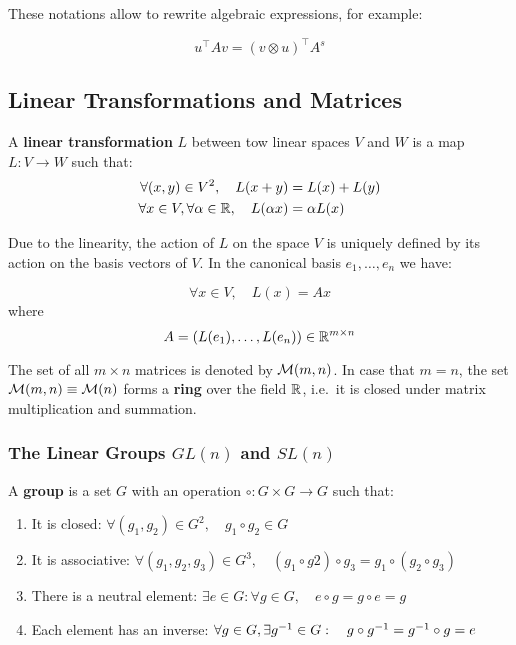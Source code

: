 \noindent
These notations allow to rewrite algebraic expressions, for example:

\[u^{\top} A v = {( v \otimes u )}^{\top} A^s\]

\subsection{Linear Transformations and Matrices}
\label{sub:linear_transformations_and_matrices}

A \textbf{linear transformation} $L$ between tow linear spaces
$V$ and $W$ is a map $L : V \rightarrow W$ such that:
\begin{align*}
	\forall (x,y) \in V^2 ,\quad L(x+y) &= L(x) + L(y) \\
	\forall x \in V, \forall \alpha \in \mathbb{R},\quad L(\alpha x) &= \alpha L(x)
\end{align*}

\noindent
Due to the linearity, the action of $L$ on the space $V$
is uniquely defined by its action on the basis vectors of $V$.
In the canonical basis ${e_1, \ldots, e_n}$ we have:

\[\forall x \in V, \quad L(x) = Ax\]
\noindent
where
\[A = (L(e_1), \ldots, L(e_n)) \in \mathbb{R}^{m \times n}\]

\noindent
The set of all $m \times n$ matrices is denoted by $\mathcal{M}(m,n)$.
In case that $m = n$, the set $\mathcal{M}(m,n) \equiv \mathcal{M}(n)$
forms a \textbf{ring} over the field $\mathbb{R}$, i.e.\ it is closed
under matrix multiplication and summation.


\subsubsection{The Linear Groups $GL(n)$ and $SL(n)$}
\label{ssub:the_linear_groups_gl_n_and_sl_n_}

A \textbf{group} is a set $G$ with an operation
$\circ : G \times G \rightarrow G$ such that:
\begin{enumerate}
	\item It is closed:
		$\forall (g_1, g_2) \in G^2, \quad g_1 \circ g_2 \in G$
	\item It is associative:
		$\forall (g_1, g_2, g_3) \in G^3, \quad
		(g_1 \circ g2) \circ g_3 = g_1 \circ (g_2 \circ g_3)$
	\item There is a neutral element:
		$\exists e \in G: \forall g \in G, \quad
		e \circ g = g \circ e = g$
	\item Each element has an inverse:
		$\forall g \in G, \exists g^{-1} \in G : \quad
		g \circ g^{-1} = g^{-1} \circ g = e$
\end{enumerate}

